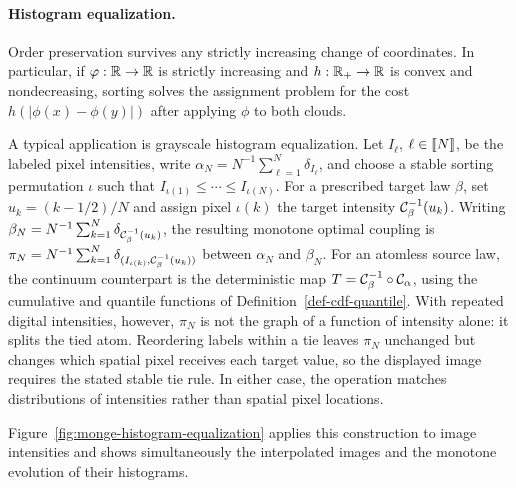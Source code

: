 \paragraph{Histogram equalization.}
Order preservation survives any strictly increasing change of coordinates. In particular, if $\varphi:\mathbb{R}\to\mathbb{R}$ is strictly increasing and $h:\mathbb{R}_+\to\mathbb{R}$ is convex and nondecreasing, sorting solves the assignment problem for the cost $h(|\phi(x)-\phi(y)|)$ after applying $\phi$ to both clouds.

A typical application is grayscale histogram equalization. Let $I_\ell$, $\ell\in\llbracket N\rrbracket$, be the labeled pixel intensities, write $\alpha_N=N^{-1}\sum_{\ell=1}^N\delta_{I_\ell}$, and choose a stable sorting permutation $\iota$ such that $I_{\iota(1)}\leq\cdots\leq I_{\iota(N)}$. For a prescribed target law $\beta$, set $u_k=(k-1/2)/N$ and assign pixel $\iota(k)$ the target intensity $\mathcal{C}_{\beta}^{-1}(u_k)$. Writing $\beta_N=N^{-1}\sum_{k=1}^N\delta_{\mathcal{C}_{\beta}^{-1}(u_k)}$, the resulting monotone optimal coupling is $\pi_N=N^{-1}\sum_{k=1}^N\delta_{(I_{\iota(k)},\mathcal{C}_{\beta}^{-1}(u_k))}$ between $\alpha_N$ and $\beta_N$. For an atomless source law, the continuum counterpart is the deterministic map $T=\mathcal{C}_{\beta}^{-1}\circ \mathcal{C}_{\alpha}$, using the cumulative and quantile functions of Definition~\ref{def-cdf-quantile}. With repeated digital intensities, however, $\pi_N$ is not the graph of a function of intensity alone: it splits the tied atom. Reordering labels within a tie leaves $\pi_N$ unchanged but changes which spatial pixel receives each target value, so the displayed image requires the stated stable tie rule. In either case, the operation matches distributions of intensities rather than spatial pixel locations.

Figure~\ref{fig:monge-histogram-equalization} applies this construction to image intensities and shows simultaneously the interpolated images and the monotone evolution of their histograms.

